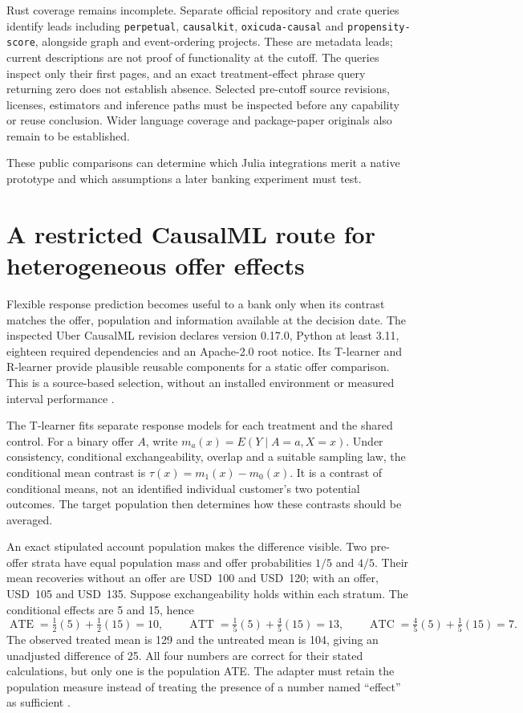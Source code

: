 Rust coverage remains incomplete. Separate official repository and crate
queries identify leads including \texttt{perpetual}, \texttt{causalkit},
\texttt{oxicuda-causal} and \texttt{propensity-score}, alongside graph and
event-ordering projects. These are metadata leads; current descriptions are
not proof of functionality at the cutoff. The queries inspect only their
first pages, and an exact treatment-effect phrase query returning zero does
not establish absence. Selected pre-cutoff source revisions, licenses,
estimators and inference paths must be inspected before any capability or
reuse conclusion. Wider language coverage and package-paper originals also
remain to be established. \cite{exec21_effects_discovery}

These public comparisons can determine which Julia integrations merit a
native prototype and which assumptions a later banking experiment must test.


\section{A restricted CausalML route for heterogeneous offer effects}
\label{exec14:causalml}

Flexible response prediction becomes useful to a bank only when its contrast
matches the offer, population and information available at the decision date.
The inspected Uber CausalML revision declares version 0.17.0, Python at least
3.11, eighteen required dependencies and an Apache-2.0 root notice. Its
T-learner and R-learner provide plausible reusable components for a static
offer comparison. This is a source-based selection, without an installed
environment or measured interval performance \citep{exec14_causalml_primary}.

The T-learner fits separate response models for each treatment and the shared
control. For a binary offer $A$, write
$m_a(x)=E(Y\mid A=a,X=x)$. Under consistency, conditional exchangeability,
overlap and a suitable sampling law, the conditional mean contrast is
$\tau(x)=m_1(x)-m_0(x)$. It is a contrast of conditional means, not an identified
individual customer's two potential outcomes. The target population then
determines how these contrasts should be averaged.

An exact stipulated account population makes the difference visible. Two
pre-offer strata have equal population mass and offer probabilities $1/5$
and $4/5$. Their mean recoveries without an offer are USD~100 and USD~120;
with an offer, USD~105 and USD~135. Suppose exchangeability holds within each
stratum. The conditional effects are 5 and 15, hence
\[
\operatorname{ATE}=\tfrac12(5)+\tfrac12(15)=10,\qquad
\operatorname{ATT}=\tfrac15(5)+\tfrac45(15)=13,\qquad
\operatorname{ATC}=\tfrac45(5)+\tfrac15(15)=7.
\]
The observed treated mean is 129 and the untreated mean is 104, giving an
unadjusted difference of 25. All four numbers are correct for their stated
calculations, but only one is the population ATE. The adapter must retain
the population measure instead of treating the presence of a number named
``effect'' as sufficient \citep{exec14_causalml_oracle}.

